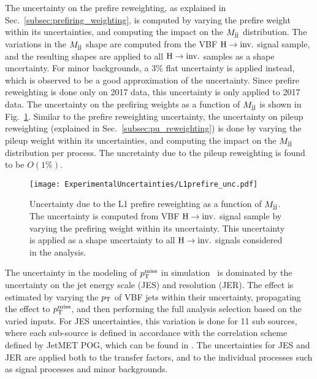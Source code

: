 The uncertainty on the prefire reweighting, as explained in Sec.~\ref{subsec:prefiring_weighting}, is computed by varying the prefire weight
within its uncertainties, and computing the impact on the $M_{\textrm{jj}}$ distribution. The variations in the $M_{\textrm{jj}}$ shape are computed from the VBF $\textrm{H} \rightarrow \textrm{inv.}$
signal sample, and the resulting shapes are applied to all $\textrm{H} \rightarrow \textrm{inv.}$ samples as a shape uncertainty. For minor backgrounds,
a $3\%$ flat uncertainty is applied instead, which is observed to be a good approximation of the uncertainty. Since prefire reweighting is done only
on 2017 data, this uncertainty is only applied to 2017 data.
The uncertainty on the prefiring weights as a function of $M_{\textrm{jj}}$ is shown in Fig.~\ref{fig:l1prefire_unc}.
Similar to the prefire reweighting uncertainty, the uncertainty on pileup reweighting (explained in Sec.~\ref{subsec:pu_reweighting}) is done by varying the pileup
weight within its uncertainties, and computing the impact on the $M_{\textrm{jj}}$ distribution per process. The uncretainty due to the pileup reweighting is found to be $O(1\%)$.

\begin{figure}[htbp]
  \centering
  \texttt{[image: ExperimentalUncertainties/L1prefire\_unc.pdf]}
  \caption{Uncertainty due to the L1 prefire reweighting as a function of $M_{\textrm{jj}}$. The uncertainty is computed from VBF $\textrm{H} \rightarrow \textrm{inv.}$
  signal sample by varying the prefiring weight within its uncertainty. This uncertainty is applied as a shape uncertainty to all
  $\textrm{H} \rightarrow \textrm{inv.}$ signals considered in the analysis.}
  \label{fig:l1prefire_unc}
\end{figure}



The uncertainty in the modeling of $p_{\textrm{T}}^{\textrm{miss}}$ in simulation~\cite{Khachatryan:2014gga} is dominated by the uncertainty on the jet energy scale (JES) 
and resolution (JER). The effect is estimated by varying the $p_{\textrm{T}}$ of VBF jets within their uncertainty, propagating the effect to $p_{\textrm{T}}^{\textrm{miss}}$, and then 
performing the full analysis selection based on the varied inputs. For JES uncertainties, this variation is done for 11 sub sources, where each 
sub-source is defined in accordance with the correlation scheme defined by JetMET POG, which can be found in \cite{jetMET_twiki}. The uncertainties for JES and
JER are applied both to the transfer factors, and to the individual processes such as signal processes and minor backgrounds.

